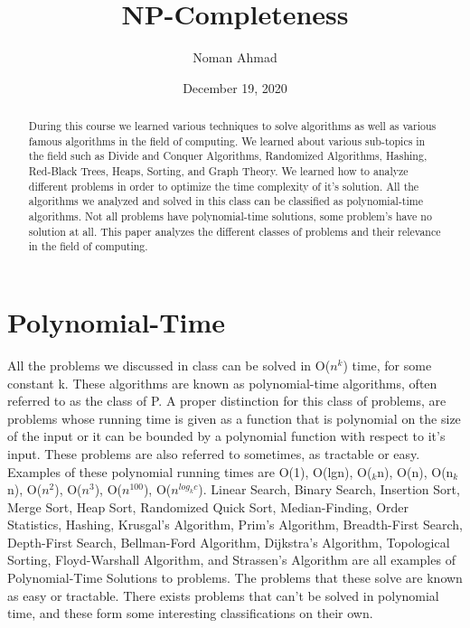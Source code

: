 \documentclass{article}
\title{NP-Completeness}
\author{Noman Ahmad}
\affil{Hunter College Department of Computer Science}
\date{December 19, 2020}
\begin{document}
\maketitle
\begin{abstract}
    During this course we learned various techniques to solve algorithms as well as various famous algorithms in the field of computing. We learned about various sub-topics in the field such as Divide and Conquer Algorithms,  Randomized Algorithms, Hashing, Red-Black Trees, Heaps, Sorting, and Graph Theory. We learned how to analyze different problems in order to optimize the time complexity of it’s solution. All the algorithms we analyzed and solved in this class can be classified as polynomial-time algorithms. Not all problems have polynomial-time solutions, some problem's have no solution at all. This paper analyzes the different classes of problems and their relevance in the field of computing.  
\end{abstract}
\section*{Polynomial-Time}
    All the problems we discussed in class can be solved in O($n^{k}$) time, for some constant k. These algorithms are known as polynomial-time algorithms, often referred to as the class of P. A proper distinction for this class of problems, are problems whose running time is given as a function that is polynomial on the size of the input or it can be bounded by a polynomial function with respect to it's input. These problems are also referred to sometimes, as tractable or easy. Examples of these polynomial running times are O(1), O(lgn), O(\log $_{k}$n), O(n), O(n\log$_{k}$n), O($n^{2}$), O($n^{3}$), O($n^{100}$), O($n^{log_{k}c}$). Linear Search, Binary Search, Insertion Sort, Merge Sort, Heap Sort, Randomized Quick Sort, Median-Finding, Order Statistics, Hashing, Krusgal's Algorithm, Prim's Algorithm, Breadth-First Search, Depth-First Search, Bellman-Ford Algorithm, Dijkstra's Algorithm, Topological Sorting, Floyd-Warshall Algorithm, and Strassen's Algorithm are all examples of Polynomial-Time Solutions to problems. The problems that these solve are known as easy or tractable. There exists problems that can't be solved in polynomial time, and these form some interesting classifications on their own\cite{polynomial}\cite{clrs}. 
\end{document}
